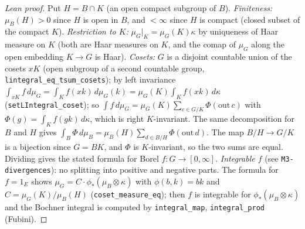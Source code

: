 \begin{proof}[Lean proof]
Put $H=B\cap K$ (an open compact subgroup of $B$). \emph{Finiteness:} $\mu_B(H)>0$ since $H$ is open in $B$, and $<\infty$ since $H$ is compact (closed subset of the compact $K$). \emph{Restriction to $K$:} $\mu_G|_K=\mu_G(K)\kappa$ by uniqueness of Haar measure on $K$ (both are Haar measures on $K$, and the comap of $\mu_G$ along the open embedding $K\to G$ is Haar). \emph{Cosets:} $G$ is a disjoint countable union of the cosets $xK$ (open subgroup of a second countable group, \texttt{lintegral\_eq\_tsum\_cosets}); by left invariance $\int_{xK}f\,d\mu_G=\int_Kf(xk)\,d\mu_G(k)=\mu_G(K)\int_Kf(xk)\,d\kappa$ (\texttt{setLIntegral\_coset}); so $\int f\,d\mu_G=\mu_G(K)\sum_{c\in G/K}\Phi(\mathrm{out}\,c)$ with $\Phi(g)=\int_Kf(gk)\,d\kappa$, which is right $K$-invariant. The same decomposition for $B$ and $H$ gives $\int_B\Phi\,d\mu_B=\mu_B(H)\sum_{d\in B/H}\Phi(\mathrm{out}\,d)$. The map $B/H\to G/K$ is a bijection since $G=BK$, and $\Phi$ is $K$-invariant, so the two sums are equal. Dividing gives the stated formula for Borel $f\colon G\to[0,\infty]$. \emph{Integrable $f$} (see \texttt{M3-divergences}): no splitting into positive and negative parts. The formula for $f=1_E$ shows $\mu_G=C\cdot\phi_*(\mu_B\otimes\kappa)$ with $\phi(b,k)=bk$ and $C=\mu_G(K)/\mu_B(H)$ (\texttt{coset\_measure\_eq}); then $f$ is integrable for $\phi_*(\mu_B\otimes\kappa)$ and the Bochner integral is computed by \texttt{integral\_map}, \texttt{integral\_prod} (Fubini).
\end{proof}

